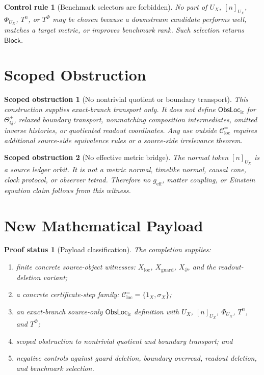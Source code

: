 \documentclass[11pt]{article}
\newcommand{\ObsLocLC}{\mathsf{ObsLoc}_{\mathrm{lc}}}
\newcommand{\geff}{g_{\mathrm{eff}}}
\newcommand{\Block}{\mathsf{Block}}
\newtheorem{proofstatus}{Proof status}
\newtheorem{controlrule}{Control rule}
\newtheorem{obstruction}{Scoped obstruction}
\begin{document}
\begin{controlrule}[Benchmark selectors are forbidden]
No part of \(U_X\), \([n]_{U_X}\), \(\Phi_{U_X}\), \(T^n\), or
\(T^\Phi\) may be chosen because a downstream candidate performs well,
matches a target metric, or improves benchmark rank. Such selection
returns \(\Block\).
\end{controlrule}

\section{Scoped Obstruction}

\begin{obstruction}[No nontrivial quotient or boundary transport]
This construction supplies exact-branch transport only. It does not
define \(\ObsLocLC\) for \(\Theta_Q^{+}\), relaxed boundary transport,
nonmatching composition intermediates, omitted inverse histories, or
quotiented readout coordinates. Any use outside
\(\mathcal{C}^{=}_{\mathrm{loc}}\) requires additional source-side
equivalence rules or a source-side irrelevance theorem.
\end{obstruction}

\begin{obstruction}[No effective metric bridge]
The normal token \([n]_{U_X}\) is a source ledger orbit. It is not a
metric normal, timelike normal, causal cone, clock protocol, or
observer tetrad. Therefore no \(\geff\), matter coupling, or Einstein
equation claim follows from this witness.
\end{obstruction}

\section{New Mathematical Payload}

\begin{proofstatus}[Payload classification]
The completion supplies:
\begin{enumerate}
    \item finite concrete source-object witnesses:
    \(X_{\mathrm{loc}}\), \(X_{\mathrm{guard}}\),
    \(X_{\partial}\), and the readout-deletion variant;
    \item a concrete certificate-step family:
    \(\mathcal{C}^{=}_{\mathrm{loc}}=\{1_X,\sigma_X\}\);
    \item an exact-branch source-only \(\ObsLocLC\) definition with
    \(U_X\), \([n]_{U_X}\), \(\Phi_{U_X}\), \(T^n\), and \(T^\Phi\);
    \item scoped obstruction to nontrivial quotient and boundary
    transport; and
    \item negative controls against guard deletion, boundary overread,
    readout deletion, and benchmark selection.
\end{enumerate}
\end{proofstatus}
\end{document}

